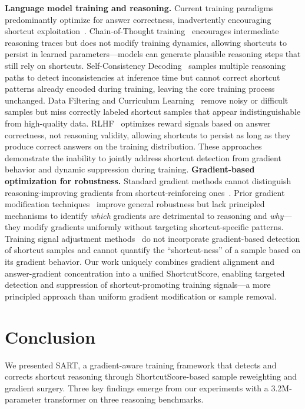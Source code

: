 \documentclass{article}
\begin{document}
\textbf{Language model training and reasoning.}
Current training paradigms predominantly optimize for answer correctness, inadvertently encouraging shortcut exploitation~\cite{Author_Year_KeyWord}. Chain-of-Thought training~\cite{wei2022chain,kojima2022large} encourages intermediate reasoning traces but does not modify training dynamics, allowing shortcuts to persist in learned parameters---models can generate plausible reasoning steps that still rely on shortcuts. Self-Consistency Decoding~\cite{wang2022self} samples multiple reasoning paths to detect inconsistencies at inference time but cannot correct shortcut patterns already encoded during training, leaving the core training process unchanged. Data Filtering and Curriculum Learning~\cite{bengio2009curriculum} remove noisy or difficult samples but miss correctly labeled shortcut samples that appear indistinguishable from high-quality data. RLHF~\cite{ouyang2022training} optimizes reward signals based on answer correctness, not reasoning validity, allowing shortcuts to persist as long as they produce correct answers on the training distribution. These approaches demonstrate the inability to jointly address shortcut detection from gradient behavior and dynamic suppression during training.
%
\textbf{Gradient-based optimization for robustness.}
Standard gradient methods cannot distinguish reasoning-improving gradients from shortcut-reinforcing ones~\cite{Author_Year_KeyWord}. Prior gradient modification techniques~\cite{Author_Year_KeyWord,yu2020gradient} improve general robustness but lack principled mechanisms to identify \emph{which} gradients are detrimental to reasoning and \emph{why}---they modify gradients uniformly without targeting shortcut-specific patterns. Training signal adjustment methods~\cite{Author_Year_KeyWord} do not incorporate gradient-based detection of shortcut samples and cannot quantify the ``shortcut-ness'' of a sample based on its gradient behavior. Our work uniquely combines gradient alignment and answer-gradient concentration into a unified ShortcutScore, enabling targeted detection and suppression of shortcut-promoting training signals---a more principled approach than uniform gradient modification or sample removal.


\section{Conclusion}

We presented SART, a gradient-aware training framework that detects and corrects shortcut reasoning through ShortcutScore-based sample reweighting and gradient surgery. Three key findings emerge from our experiments with a 3.2M-parameter transformer on three reasoning benchmarks.
\end{document}
